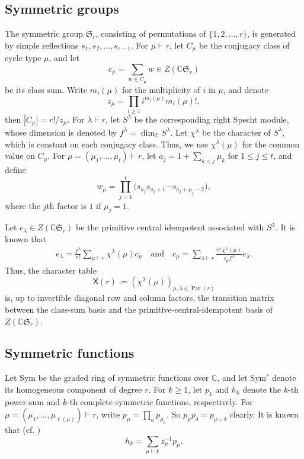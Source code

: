 \documentclass[11pt]{amsart}
\numberwithin{equation}{section}
\theoremstyle{plain}
\theoremstyle{definition}
\theoremstyle{remark}
\begin{document}
\subsection{Symmetric groups}
The symmetric group $\mathfrak S_r$, consisting of permutations of $\{1,2,\ldots,r\}$, is generated by simple reflections $s_1,s_2,\ldots, s_{r-1}$. For $\mu\vdash r$, let $C_\mu$ be the conjugacy class of cycle type $\mu$, and let
\begin{equation}\label{def:cmu}
c_\mu=\sum_{w\in C_\mu}w\in Z(\mathbb C\mathfrak S_r)
\end{equation}
be its class sum. Write $m_i(\mu)$ for the
multiplicity of $i$ in $\mu$, and denote
$$z_\mu=\prod_{i\geq1}i^{m_i(\mu)}m_i(\mu)!,$$ then
$|C_\mu|=r!/z_\mu$. For $\lambda\vdash r$, let $S^\lambda$ be
the corresponding right Specht module, whose dimension is denoted by $f^\lambda=\dim_{\mathbb C}S^\lambda$. Let $\chi^\lambda$ be the character of $S^\lambda$, which is constant on each conjugacy class. Thus, we use
$\chi^\lambda(\mu)$ for the common value on $C_\mu$. 
For $\mu=(\mu_1,\ldots,\mu_t)\vdash r$, let
$a_j=1+\sum_{k<j}\mu_k$ for $1\le j\le t$, and define
\begin{equation}\label{eq:w-mu}
w_\mu=\prod_{j=1}^t
\bigl(s_{a_j}s_{a_j+1}\cdots s_{a_j+\mu_j-2}\bigr),
\end{equation}
where the $j$th factor is $1$ if $\mu_j=1$.

Let
$e_\lambda\in Z(\mathbb C\mathfrak S_r)$ be the primitive central
idempotent associated with $S^\lambda$. It is known that
\begin{align}\label{eq:class-idem}
e_\lambda
=\frac{f^\lambda}{r!}
  \sum_{\mu\vdash r}\chi^\lambda(\mu)c_\mu \quad\text{and}\quad
c_\mu
=\sum_{\lambda\vdash r}
  \frac{r!\,\chi^\lambda(\mu)}{z_\mu f^\lambda}e_\lambda.
\end{align}
Thus, the character table 
\begin{equation}\label{eq:chartable}
\mathsf{X}(r):=(\chi^\lambda(\mu))_{
\mu,\lambda\in\operatorname{Par}(r)}
\end{equation}
is, up to invertible diagonal
row and column factors, the transition matrix between the class-sum
basis and the primitive-central-idempotent basis of $Z(\mathbb C\mathfrak S_r)$.


\subsection{Symmetric functions}
Let $\mathrm{Sym}$ be the graded ring of symmetric functions over $\mathbb C$, and let $\mathrm{Sym}^r$ denote its homogeneous component of degree $r$. For $k\geq1$, let $p_k$ and $h_k$ denote
the $k$-th power-sum and $k$-th complete symmetric functions, respectively. For
$\mu=(\mu_1,\ldots,\mu_{\ell(\mu)})\vdash r$, write
$p_\mu=\prod_a p_{\mu_a}$. So $p_\mu p_\delta=p_{\mu\cup\delta}$ clearly. It is known that (cf.
\cite[Chapter I, (2.14')]{Mac95})
\begin{equation}\label{eq:h-p}
h_k=\sum_{\mu\vdash k}z_{\mu}^{-1}p_\mu.
\end{equation}
\end{document}
